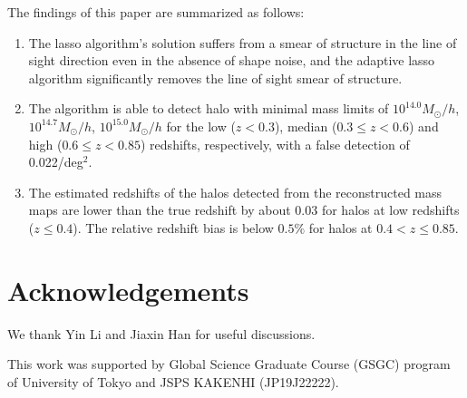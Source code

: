 \documentclass[twocolumn]{aastex62}
\begin{document}
The findings of this paper are summarized as follows:
\begin{enumerate}
 \item The lasso algorithm's solution suffers from a smear of structure in
     the line of sight direction even in the absence of shape noise, and the
     adaptive lasso algorithm significantly removes the line of sight smear of
     structure.
 \item The algorithm is able to detect halo with minimal mass limits of
     $10^{14.0} M_{\odot}/h$, $10^{14.7} M_{\odot}/h$, $10^{15.0} M_{\odot}/h$
     for the low ($z<0.3$), median ($0.3\leq z< 0.6$) and high ($0.6\leq z<
     0.85$) redshifts, respectively, with a false detection of 0.022/deg$^2$.
 \item The estimated redshifts of the halos detected from the reconstructed mass
     maps are lower than the true redshift by about $0.03$ for halos at low
     redshifts ($z\leq 0.4$).  The relative redshift bias is below $0.5\%$ for
     halos at $0.4<z\leq 0.85$.
\end{enumerate}

\section*{Acknowledgements}
We thank Yin Li and Jiaxin Han for useful discussions.

This work was supported by Global Science Graduate Course (GSGC) program of
University of Tokyo and JSPS KAKENHI (JP19J22222).


\end{document}
